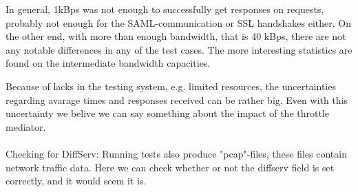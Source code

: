     In general, 1kBps was not enough to successfully get responses on requests, probably not enough for the SAML-communication or SSL handshakes either. On the other end, with more than enough bandwidth, that is 40 kBps, there are not any notable differences in any of the test cases. The more interesting statistics are found on the intermediate bandwidth capacities.

    Because of lacks in the testing system, e.g. limited resources, the uncertainties regarding avarage times and responses received can be rather big. Even with this uncertainty we belive we can say something about the impact of the throttle mediator.\\\\

    Checking for DiffServ: Running tests also produce "pcap"-files, these files contain network traffic data. Here we can check whether or not the diffserv field is set correctly, and it would seem it is. 
